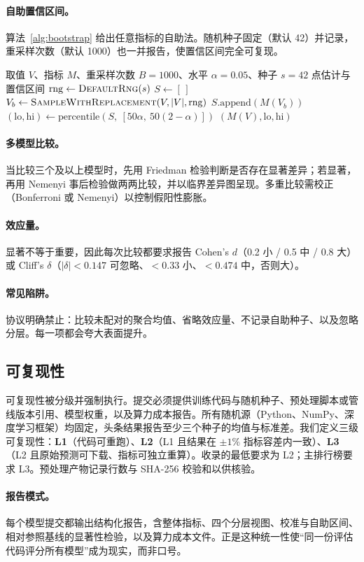 \paragraph{自助置信区间。}算法~\ref{alg:bootstrap} 给出任意指标的自助法。随机种子固定（默认 42）并记录，重采样次数（默认 1000）也一并报告，使置信区间完全可复现。

\begin{algorithm}[t]
\caption{指标的自助置信区间。}
\label{alg:bootstrap}
\begin{algorithmic}[1]
\Require 取值 $V$、指标 $M$、重采样次数 $B=1000$、水平 $\alpha=0.05$、种子 $s=42$
\Ensure 点估计与置信区间
\State $\mathrm{rng} \gets \textsc{DefaultRng}(s)$
\State $S \gets [\,]$
    \State $V_b \gets \textsc{SampleWithReplacement}(V, |V|, \mathrm{rng})$
    \State $S.\mathrm{append}(M(V_b))$
\EndFor
\State $(\text{lo}, \text{hi}) \gets \mathrm{percentile}(S,\ [50\alpha,\ 50(2-\alpha)])$
\State \Return $(M(V), \text{lo}, \text{hi})$
\end{algorithmic}
\end{algorithm}

\paragraph{多模型比较。}当比较三个及以上模型时，先用 Friedman 检验判断是否存在显著差异；若显著，再用 Nemenyi 事后检验做两两比较，并以临界差异图呈现。多重比较需校正（Bonferroni 或 Nemenyi）以控制假阳性膨胀。

\paragraph{效应量。}显著不等于重要，因此每次比较都要求报告 Cohen's $d$（0.2 小 / 0.5 中 / 0.8 大）或 Cliff's $\delta$（$|\delta|<0.147$ 可忽略、$<0.33$ 小、$<0.474$ 中，否则大）。

\paragraph{常见陷阱。}协议明确禁止：比较未配对的聚合均值、省略效应量、不记录自助种子、以及忽略分层。每一项都会夸大表面提升。

\subsection{可复现性}
\label{sec:protocol-repro}

可复现性被分级并强制执行。提交必须提供训练代码与随机种子、预处理脚本或管线版本引用、模型权重，以及算力成本报告。所有随机源（Python、NumPy、深度学习框架）均固定，头条结果报告至少三个种子的均值与标准差。我们定义三级可复现性：\textbf{L1}（代码可重跑）、\textbf{L2}（L1 且结果在 $\pm 1\%$ 指标容差内一致）、\textbf{L3}（L2 且原始预测可下载、指标可独立重算）。收录的最低要求为 L2；主排行榜要求 L3。预处理产物记录行数与 SHA-256 校验和以供核验。

\paragraph{报告模式。}每个模型提交都输出结构化报告，含整体指标、四个分层视图、校准与自助区间、相对参照基线的显著性检验，以及算力成本文件。正是这种统一性使“同一份评估代码评分所有模型”成为现实，而非口号。
